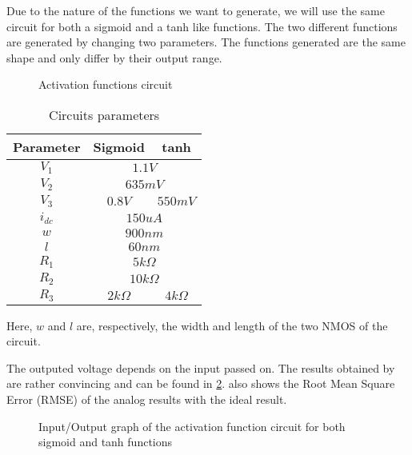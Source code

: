 Due to the nature of the functions we want to generate, we will use the same circuit for both a sigmoid and a \ac{tanh} like functions. The two different functions are generated by changing two parameters. The functions generated are the same shape and only differ by their output range.

\begin{figure}[t]
  \centering
  
  \caption{Activation functions circuit}
  \label{circt:af}
\end{figure}

\begin{table}[t]
  \caption{Circuits parameters}
  \label{tab:afPar}
  \centering
  \begin{tabular}{|c|c|c|}
    \hline
    \textbf{Parameter} & \textbf{Sigmoid} & \textbf{\ac{tanh}} \\
    \hline
    $V_1$ & \multicolumn{2}{c|}{$1.1V$}\\
    \hline
    $V_2$ & \multicolumn{2}{c|}{$635mV$}\\
    \hline
    $V_3$ & $0.8V$ & $550mV$\\
    \hline
    $i_{dc}$ & \multicolumn{2}{c|}{$150uA$}\\
    \hline
    $w$ & \multicolumn{2}{c|}{$900nm$}\\
    \hline
    $l$ & \multicolumn{2}{c|}{$60nm$}\\
    \hline
    $R_1$ & \multicolumn{2}{c|}{$5k\Omega$}\\
    \hline
    $R_2$ & \multicolumn{2}{c|}{$10k\Omega$}\\
    \hline
    $R_3$ & $2k\Omega$ & $4k\Omega$\\
    \hline
  \end{tabular}
\end{table}

Here, $w$ and $l$ are, respectively, the width and length of the two NMOS of the circuit.

The outputed voltage depends on the input passed on. The results obtained by are rather convincing and can be found in \cref{graph:af}.  also shows the Root Mean Square Error (RMSE) of the analog results with the ideal result.

\begin{figure}[b]
  \centering
  
  \caption{Input/Output graph of the activation function circuit for both sigmoid and \acs{tanh} functions}
  \label{graph:af}
\end{figure}

